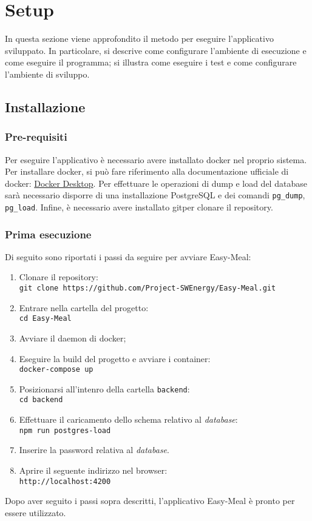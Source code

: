\section{Setup}
In questa sezione viene approfondito il metodo per eseguire l'applicativo
sviluppato. In particolare, si descrive come configurare l'ambiente di
esecuzione e come eseguire il programma; si illustra come eseguire i test e come
configurare l'ambiente di sviluppo.


\subsection{Installazione}


\subsubsection{Pre-requisiti}
Per eseguire l'applicativo è necessario avere installato docker nel proprio
sistema. Per installare docker, si può fare riferimento alla documentazione
ufficiale di docker:
\href{https://www.docker.com/products/docker-desktop/}{Docker Desktop}.
Per effettuare le operazioni di dump e load del database sarà necessario disporre di una installazione PostgreSQL e dei comandi \texttt{pg\_dump}, \texttt{pg\_load}.
Infine, è necessario avere installato git\g per clonare il repository.


\subsubsection{Prima esecuzione}
Di seguito sono riportati i passi da seguire per avviare Easy-Meal:
\begin{enumerate}
	\item Clonare il repository\g: \\
		\texttt{git clone https://github.com/Project-SWEnergy/Easy-Meal.git}
	\item Entrare nella cartella del progetto: \\
		\texttt{cd Easy-Meal}
	\item Avviare il daemon di docker;
	\item Eseguire la build del progetto e avviare i container: \\
		\texttt{docker-compose up}
	\item Posizionarsi all'intenro della cartella \texttt{backend}:\\
		\texttt{cd backend}
	\item Effettuare il caricamento dello schema relativo al \textit{database}:\\
		\texttt{npm run postgres-load}
	\item Inserire la password relativa al \textit{database}.
	\item Aprire il seguente indirizzo nel browser: \\ 
		\texttt{http://localhost:4200}
\end{enumerate}
Dopo aver seguito i passi sopra descritti, l'applicativo Easy-Meal è pronto per essere utilizzato. 


